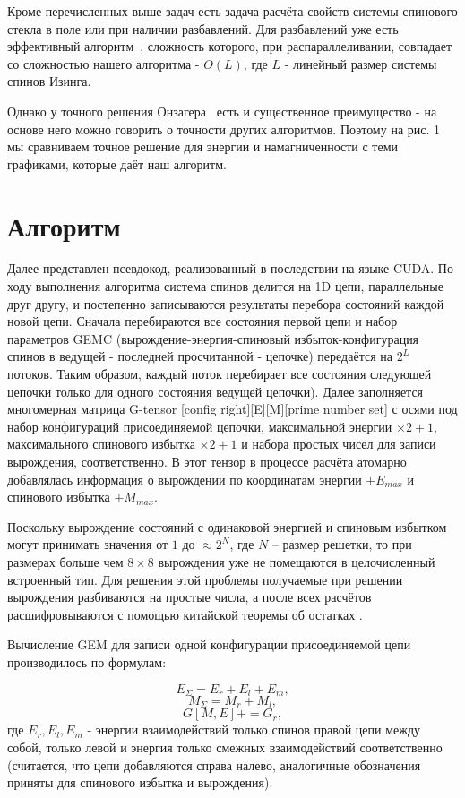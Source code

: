 \documentclass[10pt]{article}
\begin{document}
	Кроме перечисленных выше задач есть задача расчёта свойств системы спинового стекла в поле или при наличии разбавлений. Для разбавлений уже есть эффективный алгоритм~\cite{loh2006efficient}, сложность которого, при распараллеливании, совпадает со сложностью нашего алгоритма - $O(L)$, где $L$ - линейный размер системы спинов Изинга.
	
	Однако у точного решения Онзагера~\cite{onsager1944crystal} есть и существенное преимущество - на основе него можно говорить о точности других алгоритмов. Поэтому на рис. 1 мы сравниваем точное решение для энергии и намагниченности с теми графиками, которые даёт наш алгоритм.
	
	\section{Алгоритм}
	Далее представлен псевдокод, реализованный в последствии на языке CUDA. По ходу выполнения алгоритма система спинов делится на 1D цепи, параллельные друг другу, и постепенно записываются результаты перебора состояний каждой новой цепи. Сначала перебираются все состояния первой цепи и набор параметров GEMC (вырождение-энергия-спиновый избыток-конфигурация спинов в ведущей - последней просчитанной - цепочке) передаётся на $2^L$ потоков. Таким образом, каждый поток перебирает все состояния следующей цепочки только для одного состояния ведущей цепочки). Далее заполняется многомерная матрица G-tensor [config right][E][M][prime number set] с осями под набор конфигураций присоединяемой цепочки, максимальной энергии $\times 2 + 1$, максимального спинового избытка $\times 2 + 1$ и набора простых чисел для записи вырождения, соответственно. В этот тензор в процессе расчёта атомарно добавлялась информация о вырождении по координатам энергии $+ E_{max}$ и спинового избытка $+ M_{max}$.
	
	Поскольку вырождение состояний с одинаковой энергией и спиновым избытком могут принимать значения от $1$ до $\approx 2^{N}$, где $N$ -- размер решетки, то при размерах больше чем $8 \times 8$ вырождения уже не помещаются в целочисленный встроенный тип. Для решения этой проблемы получаемые при решении вырождения разбиваются на простые числа, а после всех расчётов расшифровываются с помощью китайской теоремы об остатках \cite{katz2007mathematics}.
	
	Вычисление GEM для записи одной конфигурации присоединяемой цепи производилось по формулам:
	
	\begin{equation*}
		E_\Sigma = E_r + E_l + E_m,
	\end{equation*}
	\begin{equation*}
		M_\Sigma = M_r + M_l,
	\end{equation*}
	\begin{equation*}
		G[M, E] += G_r,
	\end{equation*}
	где $E_r, E_l, E_m$ - энергии взаимодействий только спинов правой цепи между собой, только левой и энергия только смежных взаимодействий соответственно (считается, что цепи добавляются справа налево, аналогичные обозначения приняты для спинового избытка и вырождения).
	
\end{document}
